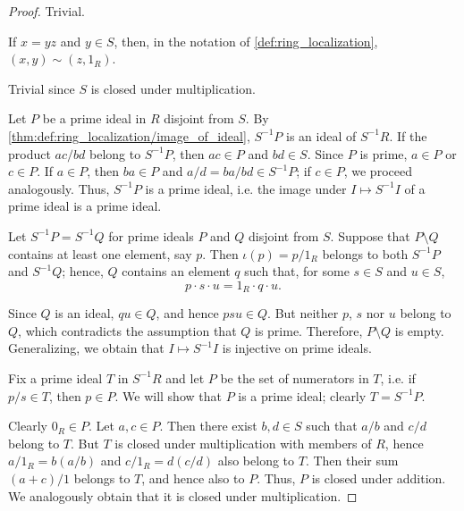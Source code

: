\begin{proof}
   Trivial.

   If \( x = yz \) and \( y \in S \), then, in the notation of \cref{def:ring_localization}, \( (x, y) \sim (z, 1_R) \).

   Trivial since \( S \) is closed under multiplication.

   Let \( P \) be a prime ideal in \( R \) disjoint from \( S \). By \cref{thm:def:ring_localization/image_of_ideal}, \( S^{-1} P \) is an ideal of \( S^{-1} R \). If the product \( {ac} / {bd} \) belong to \( S^{-1} P \), then \( ac \in P \) and \( bd \in S \). Since \( P \) is prime, \( a \in P \) or \( c \in P \). If \( a \in P \), then \( ba \in P \) and \( a / d = {ba} / {bd} \in S^{-1} P \); if \( c \in P \), we proceed analogously. Thus, \( S^{-1} P \) is a prime ideal, i.e. the image under \( I \mapsto S^{-1} I \) of a prime ideal is a prime ideal.

   Let \( S^{-1} P = S^{-1} Q \) for prime ideals \( P \) and \( Q \) disjoint from \( S \). Suppose that \( P \setminus Q \) contains at least one element, say \( p \). Then \( \iota(p) = p / {1_R} \) belongs to both \( S^{-1} P \) and \( S^{-1} Q \); hence, \( Q \) contains an element \( q \) such that, for some \( s \in S \) and \( u \in S \),
  \begin{equation*}
    p \cdot s \cdot u = 1_R \cdot q \cdot u.
  \end{equation*}

  Since \( Q \) is an ideal, \( qu \in Q \), and hence \( psu \in Q \). But neither \( p \), \( s \) nor \( u \) belong to \( Q \), which contradicts the assumption that \( Q \) is prime. Therefore, \( P \setminus Q \) is empty. Generalizing, we obtain that \( I \mapsto S^{-1} I \) is injective on prime ideals.

   Fix a prime ideal \( T \) in \( S^{-1} R \) and let \( P \) be the set of numerators in \( T \), i.e. if \( p / s \in T \), then \( p \in P \). We will show that \( P \) is a prime ideal; clearly \( T = S^{-1} P \).

  Clearly \( 0_R \in P \). Let \( a, c \in P \). Then there exist \( b, d \in S \) such that \( a / b \) and \( c / d \) belong to \( T \). But \( T \) is closed under multiplication with members of \( R \), hence \( a / 1_R = b (a / b) \) and \( c / 1_R = d (c / d) \) also belong to \( T \). Then their sum \( (a + c) / 1 \) belongs to \( T \), and hence also to \( P \). Thus, \( P \) is closed under addition. We analogously obtain that it is closed under multiplication.


\end{proof}
